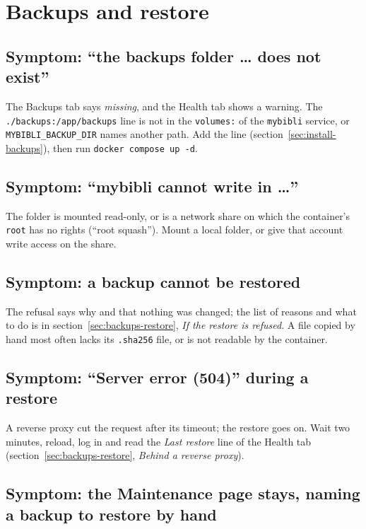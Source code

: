 \section{Backups and restore}\label{sec:troubleshoot-backups}

\subsection*{Symptom: ``the backups folder \dots{} does not exist''}

The Backups tab says \emph{missing}, and the Health tab shows a warning.
The \texttt{./backups:\allowbreak /app/backups} line is not in the
\texttt{volumes:} of the \texttt{mybibli} service, or
\texttt{MYBIBLI\_BACKUP\_DIR} names another path. Add the line
(section~\ref{sec:install-backups}), then run
\texttt{docker compose up -d}.

\subsection*{Symptom: ``mybibli cannot write in \dots''}

The folder is mounted read-only, or is a network share on which the
container's \texttt{root} has no rights (``root squash''). Mount a local
folder, or give that account write access on the share.

\subsection*{Symptom: a backup cannot be restored}

The refusal says why and that nothing was changed; the list of reasons
and what to do is in section~\ref{sec:backups-restore}, \emph{If the
restore is refused}. A file copied by hand most often lacks its
\texttt{.sha256} file, or is not readable by the container.

\subsection*{Symptom: ``Server error (504)'' during a restore}

A reverse proxy cut the request after its timeout; the restore goes
on. Wait two minutes, reload, log in and read the \emph{Last restore}
line of the Health tab (section~\ref{sec:backups-restore}, \emph{Behind
a reverse proxy}).

\subsection*{Symptom: the Maintenance page stays, naming a backup to restore by hand}

